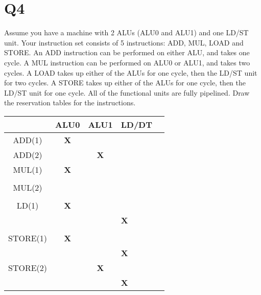\documentclass{report}
\begin{document}
\section{Q4}
\vspace{-1em}
\begin{multicols}{2}
Assume you have a machine with 2 ALUs (ALU0 and ALU1) and one LD/ST unit.
Your instruction set consists of 5 instructions: ADD, MUL, LOAD and STORE. An
ADD instruction can be performed on either ALU, and takes one cycle. A MUL
instruction can be performed on ALU0 or ALU1, and takes two cycles. A LOAD
takes up either of the ALUs for one cycle, then the LD/ST unit for two cycles. A
STORE takes up either of the ALUs for one cycle, then the LD/ST unit for one cycle.
All of the functional units are fully pipelined. Draw the reservation tables for the
instructions.
  \vfill\columnbreak
  \begin{tabular}{|c|>{\bfseries}c|>{\bfseries}c|>{\bfseries}l|>{\bfseries}l|}
    \hline
  	& ALU0   & ALU1 & LD/DT \\
    \hline
    ADD(1)   & X &   &  \\
    \hline
    ADD(2)   &   & X &  \\
    \hline
    MUL(1)   & X &   &  \\
             &   &   &  \\
    \hline
    MUL(2)   &   &   &  \\
             &   &   &  \\
    \hline
    LD(1)    & X &   &   \\
             &   &   & X \\
             &   &   &  \\
    \hline
    STORE(1) & X &   &   \\
             &   &   & X \\
    \hline
    STORE(2) &   & X &   \\
             &   &   & X \\
    \hline
  \end{tabular}
\end{multicols}
\end{document}
